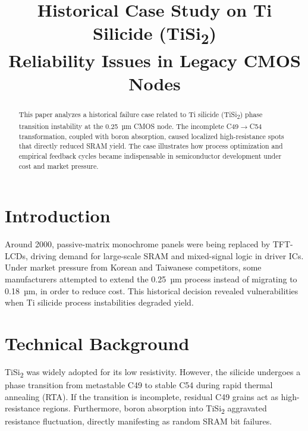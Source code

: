 \documentclass[conference]{IEEEtran}
\begin{document}
\title{Historical Case Study on Ti Silicide (TiSi\textsubscript{2}) \\ Reliability Issues in Legacy CMOS Nodes}

\author{
}

\maketitle

\begin{abstract}
This paper analyzes a historical failure case related to Ti silicide (TiSi\textsubscript{2}) phase transition instability at the 0.25~µm CMOS node. 
The incomplete C49$\rightarrow$C54 transformation, coupled with boron absorption, caused localized high-resistance spots that directly reduced SRAM yield. 
The case illustrates how process optimization and empirical feedback cycles became indispensable in semiconductor development under cost and market pressure.
\end{abstract}

\section{Introduction}
Around 2000, passive-matrix monochrome panels were being replaced by TFT-LCDs, driving demand for large-scale SRAM and mixed-signal logic in driver ICs. 
Under market pressure from Korean and Taiwanese competitors, some manufacturers attempted to extend the 0.25~µm process instead of migrating to 0.18~µm, in order to reduce cost. 
This historical decision revealed vulnerabilities when Ti silicide process instabilities degraded yield.

\section{Technical Background}
TiSi\textsubscript{2} was widely adopted for its low resistivity. 
However, the silicide undergoes a phase transition from metastable C49 to stable C54 during rapid thermal annealing (RTA). 
If the transition is incomplete, residual C49 grains act as high-resistance regions. 
Furthermore, boron absorption into TiSi\textsubscript{2} aggravated resistance fluctuation, directly manifesting as random SRAM bit failures.
\end{document}
